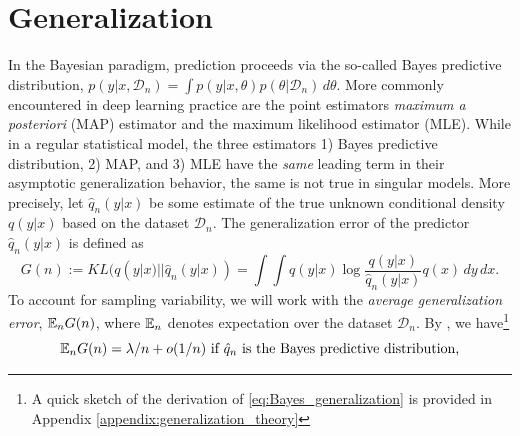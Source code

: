 \documentclass{article} %
\begin{document}
\section{Generalization}\label{section:gen_error}
In the Bayesian paradigm, prediction proceeds via the so-called Bayes predictive distribution,
$
p(y|x, \mathcal D_n) = \int p(y|x,\theta) p(\theta|\mathcal D_n) \,d\theta.
$
More commonly encountered in deep learning practice are the point estimators \textit{maximum a posteriori} (MAP) estimator and the maximum likelihood estimator (MLE).
While in a regular statistical model, the three estimators 1) Bayes predictive distribution, 2) MAP, and 3) MLE have the \textit{same} leading term in their asymptotic generalization behavior, the same is not true in singular models.
More precisely, let $\hat q_n(y|x)$ be some estimate of the true unknown conditional density $q(y|x)$ based on the dataset $\mathcal D_n$. The generalization error of the predictor $\hat q_n(y|x)$ is defined as
$$
G(n) := KL (q(y|x) || \hat q_n(y|x) ) = \int  \int q(y|x) \log \frac{q(y|x)}{\hat q_n(y|x)} q(x) \,dy  \,dx.
$$
To account for sampling variability, we will work with the \textit{average generalization error}, ${\mathbb{E}}_n G(n)$, where ${\mathbb{E}}_n$ denotes expectation over the dataset $\mathcal D_n$.
By {\citet[Theorem 1.2 and Theorem 7.2]{watanabe_algebraic_2009}}, we have\footnote{A quick sketch of the derivation of \eqref{eq:Bayes_generalization} is provided in Appendix \ref{appendix:generalization_theory}}
\begin{equation}
{\mathbb{E}}_n G(n) = \lambda/n + o(1/n)  \text{ if $\hat q_n$ is the Bayes predictive distribution,}
\label{eq:Bayes_generalization}
\end{equation}
\end{document}
